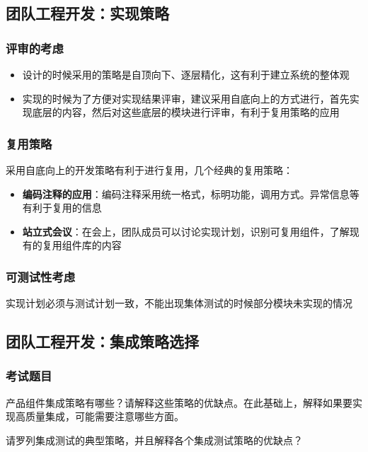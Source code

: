 \subsection{团队工程开发：实现策略}

\subsubsection{评审的考虑}
\begin{itemize}
    \item 设计的时候采用的策略是自顶向下、逐层精化，这有利于建立系统的整体观
    \item 实现的时候为了方便对实现结果评审，建议采用自底向上的方式进行，首先实现底层的内容，然后对这些底层的模块进行评审，有利于复用策略的应用
\end{itemize}

\subsubsection{复用策略}
采用自底向上的开发策略有利于进行复用，几个经典的复用策略：
\begin{itemize}
    \item \textbf{编码注释的应用}：编码注释采用统一格式，标明功能，调用方式。异常信息等有利于复用的信息
    \item \textbf{站立式会议}：在会上，团队成员可以讨论实现计划，识别可复用组件，了解现有的复用组件库的内容
\end{itemize}

\subsubsection{可测试性考虑}
实现计划必须与测试计划一致，不能出现集体测试的时候部分模块未实现的情况

\subsection{团队工程开发：集成策略选择}


\subsubsection{考试题目}
\begin{problem}
产品组件集成策略有哪些？请解释这些策略的优缺点。在此基础上，解释如果要实现高质量集成，可能需要注意哪些方面。
\end{problem}

\begin{problem}
请罗列集成测试的典型策略，并且解释各个集成测试策略的优缺点？
\end{problem}

